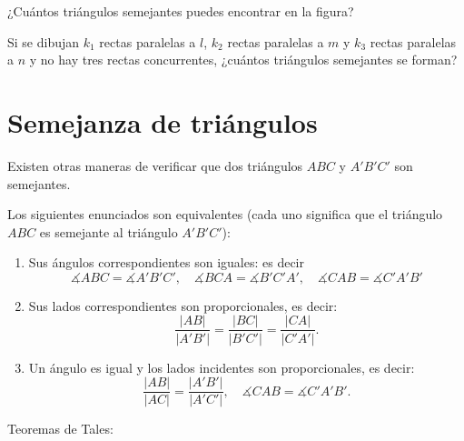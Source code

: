 \begin{ejercicio}
¿Cuántos triángulos semejantes puedes encontrar en la figura?
\end{ejercicio}

\begin{ejercicio}
Si se dibujan $k_1$ rectas paralelas a $l$, $k_2$ rectas paralelas a $m$ y $k_3$ rectas paralelas a $n$ y no hay tres rectas concurrentes, ¿cuántos triángulos semejantes se forman?
\end{ejercicio}
\newpage

\section{Semejanza de triángulos}

Existen otras maneras de verificar que dos triángulos $ABC$ y $A'B'C'$ son semejantes.

\begin{teorema}
Los siguientes enunciados son equivalentes (cada uno significa que el triángulo $ABC$ es semejante al triángulo $A'B'C'$):
\begin{enumerate}
\item Sus ángulos correspondientes son iguales: es decir $$\measuredangle ABC=\measuredangle A'B'C',\quad \measuredangle BCA=\measuredangle B'C'A', \quad \measuredangle CAB=\measuredangle C'A'B'$$
\item Sus lados correspondientes son proporcionales, es decir: $$\frac{|AB|}{|A'B'|}=\frac{|BC|}{|B'C'|}=\frac{|CA|}{|C'A'|}.$$
\item Un ángulo es igual y los lados incidentes son proporcionales, es decir: $$\frac{|AB|}{|AC|}=\frac{|A'B'|}{|A'C'|},\quad \measuredangle CAB=\measuredangle C'A'B'.$$
\end{enumerate}
\end{teorema}

\begin{teorema}
Teoremas de Tales:
\end{teorema}

